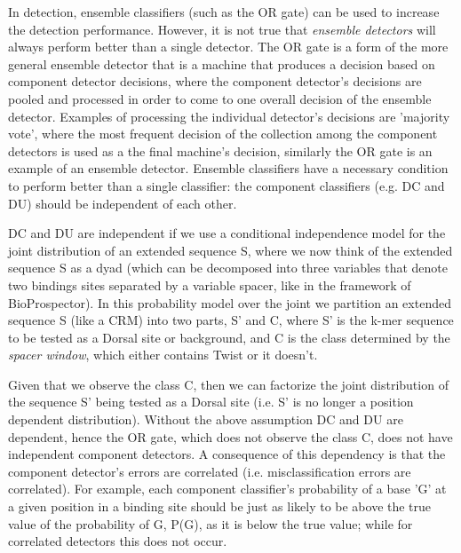  In detection, ensemble classifiers (such as the OR gate) can be used to increase the detection performance\cite{bishop}.  However, it is not true that \textit{ensemble detectors} will always perform better than a single detector.  The OR gate is a form of the more general ensemble detector that is a machine that produces a decision based on component detector decisions, where the component detector's decisions are pooled and processed in order to come to one overall decision of the ensemble detector.  Examples of processing the individual detector's decisions are 'majority vote', where the most frequent decision of the collection among the component detectors is used as a the final machine's decision, similarly the OR gate is an example of an ensemble detector.  Ensemble classifiers have a necessary condition to perform better than a single classifier: the component classifiers (e.g. DC and DU) should be independent of each other\cite{bishop}.

DC and DU are independent if we use a conditional independence model for the joint distribution of an extended sequence S, where we now think of the extended sequence S as a dyad (which can be decomposed into three variables that denote two bindings sites separated by a variable spacer, like in the framework of BioProspector).   In this probability model over the joint we partition an extended sequence S (like a CRM) into two parts, S' and C, where S' is the k-mer sequence to be tested as a Dorsal site or background, and C is the class determined by the \textit{spacer window}, which either contains Twist or it doesn't.

Given that we observe the class C, then we can factorize the joint distribution of the sequence S' being tested as a Dorsal site (i.e. S' is no longer a position dependent distribution). Without the above assumption DC and DU are dependent, hence the OR gate, which does not observe the class C, does not have independent component detectors.  A consequence of this dependency is that the component detector's errors are correlated (i.e. misclassification errors are correlated).  For example, each component classifier's probability of a base 'G' at a given position in a binding site should be just as likely to be above the true value of the probability of G, P(G), as it is below the true value; while for correlated detectors this does not occur.

